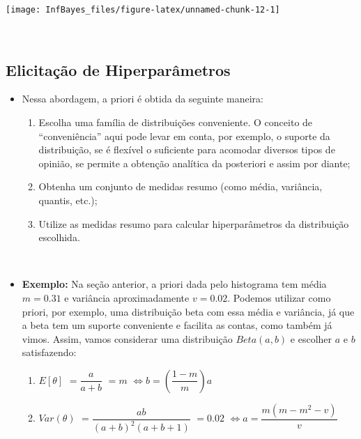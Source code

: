 \documentclass[
]{book}
\providecommand{\tightlist}{%
  \setlength{\itemsep}{0pt}\setlength{\parskip}{0pt}}
\begin{document}
\begin{center}\texttt{[image: InfBayes\_files/figure-latex/unnamed-chunk-12-1]} \end{center}

\(~\)

\hypertarget{elicitauxe7uxe3o-de-hiperparuxe2metros}{%
\subsection{Elicitação de Hiperparâmetros}\label{elicitauxe7uxe3o-de-hiperparuxe2metros}}

\begin{itemize}
\tightlist
\item
  Nessa abordagem, a priori é obtida da seguinte maneira:

  \begin{enumerate}
  \def\labelenumi{\arabic{enumi}.}
  \tightlist
  \item
    Escolha uma família de distribuições conveniente. O conceito de ``conveniência'' aqui pode levar em conta, por exemplo, o suporte da distribuição, se é flexível o suficiente para acomodar diversos tipos de opinião, se permite a obtenção analítica da posteriori e assim por diante;\\
  \item
    Obtenha um conjunto de medidas resumo (como média, variância, quantis, etc.);\\
  \item
    Utilize as medidas resumo para calcular hiperparâmetros da distribuição escolhida.
  \end{enumerate}
\end{itemize}

\(~\)

\begin{itemize}
\item
  \textbf{Exemplo:} Na seção anterior, a priori dada pelo histograma tem média \(m=0.31\) e variância aproximadamente \(v=0.02\). Podemos utilizar como priori, por exemplo, uma distribuição beta com essa média e variância, já que a beta tem um suporte conveniente e facilita as contas, como também já vimos. Assim, vamos considerar uma distribuição \(Beta(a,b)\) e escolher \(a\) e \(b\) satisfazendo:

  \begin{enumerate}
  \def\labelenumi{(\roman{enumi})}
  \tightlist
  \item
    \(E[\theta]\) \(=\dfrac{a}{a+b}\) \(=m\) \(\Longleftrightarrow b=\left(\dfrac{1-m}{m}\right)a\)
  \item
    \(Var(\theta)\) \(=\dfrac{ab}{(a+b)^2(a+b+1)}\) \(=0.02\) \(\Longleftrightarrow a=\dfrac{m(m-m^2-v)}{v}\)
  \end{enumerate}
\end{itemize}
\end{document}
